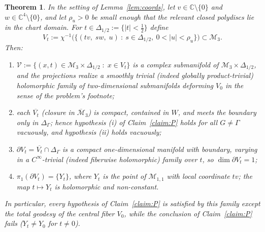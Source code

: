 \documentclass[11pt]{amsart}
\newcommand{\M}{\mathcal{M}}
\newcommand{\C}{\mathbb{C}}
\theoremstyle{plain}
\newtheorem{theorem}{Theorem}[section]
\theoremstyle{definition}
\theoremstyle{remark}
\begin{document}
\begin{theorem}\label{thm:model}
In the setting of Lemma~\textup{\ref{lem:coords}}, let
$v\in\C\setminus\{0\}$ and $w\in\C^4\setminus\{0\}$, and let
$\rho_u>0$ be small enough that the relevant closed polydiscs lie in the chart
domain. For $t\in\Delta_{1/2}:=\{|t|<\tfrac12\}$ define
\[
V_t:=\chi^{-1}\Big(\big\{(t v,\; s w,\; u)\ :\ s\in\Delta_{1/2},\ 0<|u|<\rho_u\big\}\Big)
\subset \M_3 .
\]
Then:
\begin{enumerate}
\item $\mathcal V:=\{(x,t)\in \M_3\times\Delta_{1/2}\;:\; x\in V_t\}$ is a complex
submanifold of $\M_3\times\Delta_{1/2}$, and the projections realize a smoothly
trivial (indeed globally product-trivial) holomorphic family of two-dimensional
submanifolds deforming $V_0$ in the sense of the problem's footnote;
\item each $\overline{V_t}$ (closure in $\overline{\M}_3$) is compact, contained in
$W$, and meets the boundary \emph{only} in $\Delta_\Gamma$; hence hypothesis (i) of
Claim~\ref{claim:P} holds for all $G\neq\Gamma$ vacuously, and hypothesis (ii) holds
vacuously;
\item $\partial V_t=\overline{V_t}\cap\Delta_\Gamma$ is a compact one-dimensional
manifold with boundary, varying in a $C^\infty$-trivial (indeed fiberwise
holomorphic) family over $t$, so $\dim\partial V_t=1$;
\item $\pi_1(\partial V_t)=\{Y_t\}$, where $Y_t$ is the point of $\M_{1,1}$ with
local coordinate $t v$; the map $t\mapsto Y_t$ is holomorphic and non-constant.
\end{enumerate}
In particular, \emph{every} hypothesis of Claim~\ref{claim:P} is satisfied by this
family except the total geodesy of the central fiber $V_0$, while the conclusion of
Claim~\ref{claim:P} fails ($Y_t\ne Y_0$ for $t\neq 0$).
\end{theorem}
\end{document}
